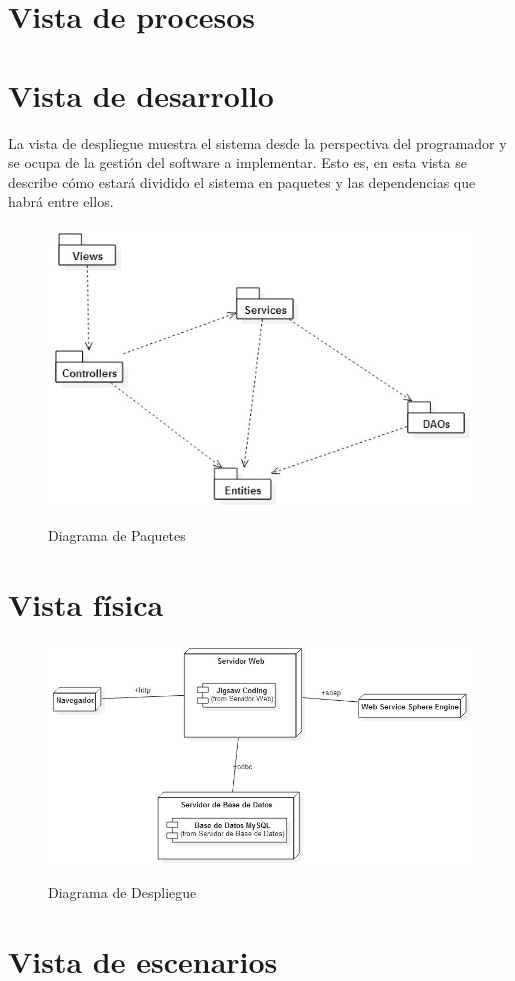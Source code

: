 \section{Vista de procesos}
\clearpage
\section{Vista de desarrollo}
La vista de despliegue muestra el sistema desde la perspectiva del programador y se ocupa de la gestión del software a implementar. Esto es, en esta vista se describe cómo estará dividido el sistema en paquetes y las dependencias que habrá entre ellos.
\begin{figure}[!h]
  \centering
  \includegraphics[scale=0.6]{figuras/sad/diagrama_de_paquetes.jpg}\\
  \caption{Diagrama de Paquetes}\label{fig:diagrama_de_paquetes}
\end{figure}
\clearpage
\section{Vista física}
\begin{figure}[!h]
  \centering
  \includegraphics[scale=0.5]{figuras/sad/diagrama_de_despliegue.jpg}\\
  \caption{Diagrama de Despliegue}\label{fig:diagrama_de_despliegue}
\end{figure}
\section{Vista de escenarios}